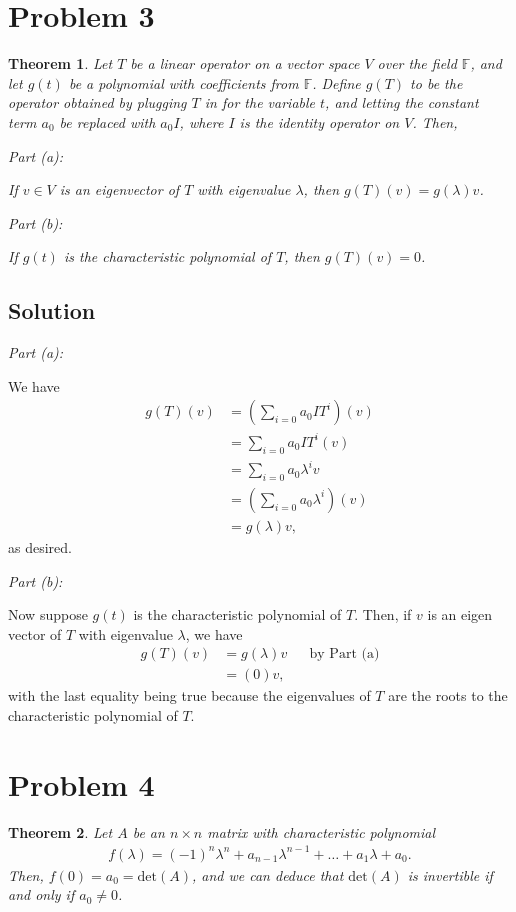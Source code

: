 \documentclass[10pt,a4paper]{article}
\makeatletter
\newtheorem{theorem}{Theorem}
\newcommand{\proofpart}[2]{%
  \par
  \addvspace{\medskipamount}%
  \noindent\emph{Part #1: #2}\par\nobreak
  \addvspace{\smallskipamount}%
  \@afterheading
}
\theoremstyle{definition}
\makeatother
\begin{document}
\section*{Problem 3}
\begin{theorem}
Let $T$ be a linear operator on a vector space $V$ over the field $\mathbb{F}$, and let $g(t)$ be a polynomial with coefficients from $\mathbb{F}$. Define $g(T)$ to be the operator obtained by plugging $T$ in for the variable $t$, and letting the constant term $a_0$ be replaced with $a_0 I$, where $I$ is the identity operator on $V$. Then, 
\proofpart{(a)}{} If $v \in V$ is an eigenvector of $T$ with eigenvalue $\lambda$, then $g(T)(v) = g(\lambda) v$.
\proofpart{(b)}{} If $g(t)$ is the characteristic polynomial of $T$, then $g(T)(v) = 0$.
\end{theorem}

\subsection*{Solution}
\proofpart{(a)}{} We have
\begin{align*}
g(T)(v) &= \left( \sum_{i = 0} a_0 I T^i \right) (v)\\
&= \sum_{i = 0} a_0 I T^i (v)\\
&= \sum_{i = 0} a_0 \lambda^i v\\
&= \left( \sum_{i = 0} a_0 \lambda^i \right) (v)\\
&= g(\lambda) v,
\end{align*}
as desired.

\proofpart{(b)}{} Now suppose $g(t)$ is the characteristic polynomial of $T$. Then, if $v$ is an eigen vector of $T$ with eigenvalue $\lambda$, we have
\begin{align*}
g(T)(v) &= g(\lambda) v &&\text{by Part (a)}\\
&= (0)v,
\end{align*}
with the last equality being true because the eigenvalues of $T$ are the roots to the characteristic polynomial of $T$.

\section*{Problem 4}
\begin{theorem}
Let $A$ be an $n \times n$ matrix with characteristic polynomial
\begin{align*}
f(\lambda) = (-1)^n \lambda^n + a_{n-1} \lambda^{n-1} + \dots + a_1 \lambda + a_0.
\end{align*}
Then, $f(0) = a_0 = \text{det}(A)$, and we can deduce that $\text{det}(A)$ is invertible if and only if $a_0 \not = 0$.
\end{theorem}
\end{document}
